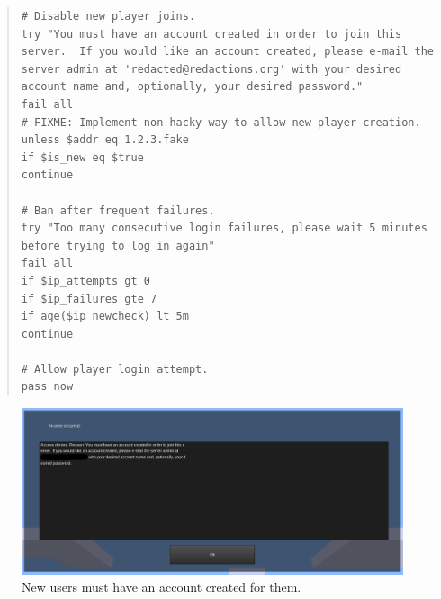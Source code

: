 \documentclass{article}
\begin{document}
\begin{quote}
\begin{verbatim}
# Disable new player joins.
try "You must have an account created in order to join this server.  If you would like an account created, please e-mail the server admin at 'redacted@redactions.org' with your desired account name and, optionally, your desired password."
fail all
# FIXME: Implement non-hacky way to allow new player creation.
unless $addr eq 1.2.3.fake
if $is_new eq $true
continue

# Ban after frequent failures.
try "Too many consecutive login failures, please wait 5 minutes before trying to log in again"
fail all
if $ip_attempts gt 0
if $ip_failures gte 7
if age($ip_newcheck) lt 5m
continue

# Allow player login attempt.
pass now
\end{verbatim}
\end{quote}

\begin{figure}
\begin{center}
\includegraphics[scale=0.5]{files/blog/2019_07_20_minetest_5_0_1_upgrade_and_server_hosting/2019_07_20_access_denied.png}
\caption{New users must have an account created for them.}
\end{center}
\end{figure}
\end{document}
